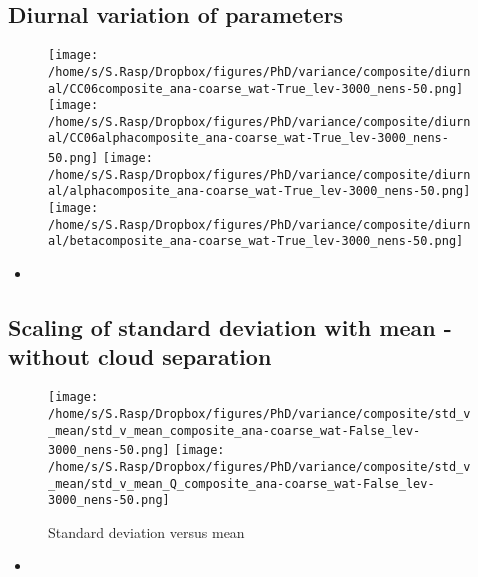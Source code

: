 \documentclass[a4paper, 12pt]{article}
\begin{document}
\newpage

\subsection{Diurnal variation of parameters}
\begin{figure}[h!]
\noindent \centering
\texttt{[image: /home/s/S.Rasp/Dropbox/figures/PhD/variance/composite/diurnal/CC06composite\_ana-coarse\_wat-True\_lev-3000\_nens-50.png]}
\texttt{[image: /home/s/S.Rasp/Dropbox/figures/PhD/variance/composite/diurnal/CC06alphacomposite\_ana-coarse\_wat-True\_lev-3000\_nens-50.png]}
\texttt{[image: /home/s/S.Rasp/Dropbox/figures/PhD/variance/composite/diurnal/alphacomposite\_ana-coarse\_wat-True\_lev-3000\_nens-50.png]}
\texttt{[image: /home/s/S.Rasp/Dropbox/figures/PhD/variance/composite/diurnal/betacomposite\_ana-coarse\_wat-True\_lev-3000\_nens-50.png]}\\
\caption{} \label{fig:geographical}
\end{figure}
\begin{itemize}
 \item 
\end{itemize}

\newpage


\subsection{Scaling of standard deviation with mean - without cloud separation}
\begin{figure}[h!]
\noindent \centering
\texttt{[image: /home/s/S.Rasp/Dropbox/figures/PhD/variance/composite/std\_v\_mean/std\_v\_mean\_composite\_ana-coarse\_wat-False\_lev-3000\_nens-50.png]}
\texttt{[image: /home/s/S.Rasp/Dropbox/figures/PhD/variance/composite/std\_v\_mean/std\_v\_mean\_Q\_composite\_ana-coarse\_wat-False\_lev-3000\_nens-50.png]}\\
\caption{Standard deviation versus mean} \label{fig:geographical}
\end{figure}
\begin{itemize}
 \item 
\end{itemize}

\newpage
\end{document}

